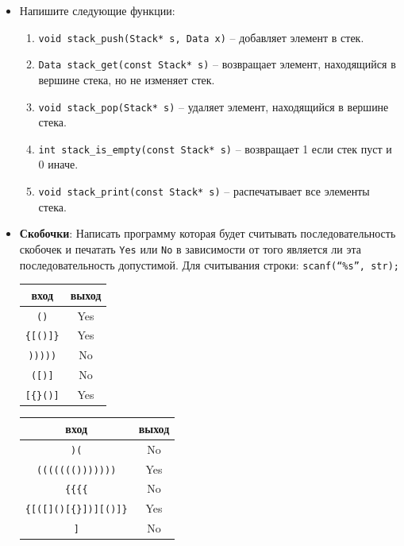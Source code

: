 \documentclass{article}
\begin{document}
\begin{itemize}
\item Напишите следующие функции:
\begin{enumerate}
\item \texttt{void stack\_push(Stack* s, Data x)} -- добавляет элемент в стек.
\item \texttt{Data stack\_get(const Stack* s)} -- возвращает элемент, находящийся в вершине стека, но не изменяет стек.
\item \texttt{void stack\_pop(Stack* s)} -- удаляет элемент, находящийся в вершине стека. 
\item \texttt{int stack\_is\_empty(const Stack* s)} -- возвращает 1 если стек пуст и 0 иначе.
\item \texttt{void stack\_print(const Stack* s)} -- распечатывает все элементы стека.
\end{enumerate}



\item \textbf{Скобочки}: Написать программу которая будет считывать последовательность скобочек и
печатать \texttt{Yes} или \texttt{No} в зависимости от того является ли эта последовательность допустимой. Для считывания строки: \texttt{scanf(``\%s'', str);}
\begin{multicols}{2}
\begin{center}
\begin{tabular}{ c | c }
 вход & выход \\ \hline
 \texttt{()} & Yes \\
 \texttt{\{[()]\}} & Yes  \\ 
 \texttt{)))))}  &  No \\ 
 \texttt{([)]}  &  No \\ 
 \texttt{[\{\}()]}  &  Yes \\ 
\end{tabular}
\end{center}

\begin{center}
\begin{tabular}{ c | c }
 вход & выход \\ \hline
 \texttt{)(}  &  No \\
 \texttt{((((((()))))))} & Yes \\
 \texttt{\{\{\{\{} & No  \\ 
 \texttt{\{[([]()[\{\}])][()]\}}  &  Yes \\ 
 \texttt{]}  &  No \\ 
\end{tabular}
\end{center}
\end{multicols}



\end{itemize}
\end{document}

